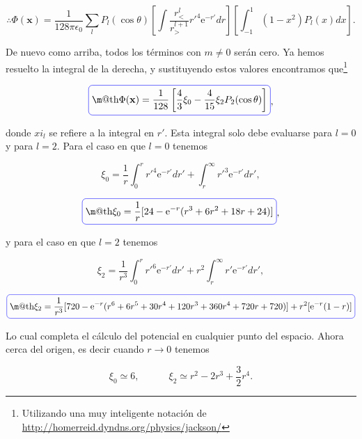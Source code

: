 \documentclass[a4paper,11pt]{article}
\makeatletter
\numberwithin{equation}{section}
\newcommand*{\boxcolor}{blue}
\renewcommand{\boxed}[1]{\textcolor{\boxcolor}{%
\tikz[baseline={([yshift=-1ex]current bounding box.center)}] \node [rectangle, minimum width=1ex,rounded corners,draw] {\normalcolor\m@th$\displaystyle#1$};}}
\newcommand{\euler}{\mathrm{e}}
\makeatother
\begin{document}
\begin{equation}
 \therefore \Phi(\mathbf{x}) = \frac{1}{128\pi \epsilon_0 }\sum_l P_l(\cos{\theta})
 \left[\int \frac{r^l_{<}}{r^{l+1}_{>}}r'^4\euler^{-r'} dr\right]
 \left[\int_{-1}^1 (1-x^2)P_l(x)dx\right].
\end{equation}

De nuevo como arriba, todos los términos con $m \neq 0$ serán cero. Ya hemos resuelto 
la integral de la derecha, y sustituyendo estos valores encontramos que\footnote{Utilizando 
una muy inteligente notación de \href{http://homerreid.dyndns.org/physics/jackson/}{http://homerreid.dyndns.org/physics/jackson/}}

\begin{equation}
 \boxed{\Phi(\mathbf{x}) = \frac{1}{128}\left[\frac{4}{3}\xi_0 - \frac{4}{15}\xi_2 
 P_2(\cos{\theta})\right]},
\end{equation}

donde $xi_l$ se refiere a la integral en $r'$. Esta integral solo debe evaluarse 
para $l=0$ y para $l=2$. Para el caso en que $l=0$ tenemos 

\begin{equation}
 \xi_0 = \frac{1}{r}\int_0^r r'^4 \euler^{-r'} dr' + \int_r^\infty r'^3\euler^{-r'} dr',
\end{equation}

\begin{equation}
 \boxed{\xi_0 = \frac{1}{r}[24 - \euler^{-r}(r^3 + 6r^2 + 18r + 24)]},
\end{equation}

y para el caso en que $l=2$ tenemos 

\begin{equation}
  \xi_2 = \frac{1}{r^3}\int_0^r r'^6 \euler^{-r'} dr' + r^2 \int_r^\infty r'\euler^{-r'} dr',
\end{equation}

\begin{equation*}
 \boxed{\xi_2 = \frac{1}{r^3}[720 - \euler^{-r}(r^6 + 6r^5 + 30r^4 + 120r^3 + 360r^4 + 
 720r + 720)] + r^2[\euler^{-r}(1-r)]}
\end{equation*}

Lo cual completa el cálculo del potencial en cualquier punto del espacio. Ahora cerca 
del origen, es decir cuando $r \rightarrow 0$ tenemos 

\begin{equation}
 \xi_0 \simeq 6, \qquad \quad \xi_2 \simeq r^2 - 2r^3 + \frac{3}{2}r^4.
\end{equation}
\end{document}
